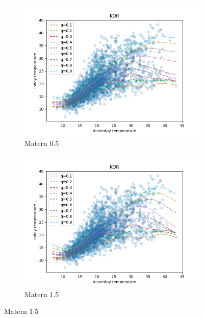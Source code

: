 \begin{figure}[!h]
    \begin{subfigure}[b]{0.5\linewidth}
        \centering
        \includegraphics[width=1.1\textwidth]{images/melborune_matern_0.5_kernel_quantile_regression.png}
        \caption{Matern 0.5} 
        \label{} 
        \vspace{4ex}
    \end{subfigure} 
    \begin{subfigure}[b]{0.5\linewidth}
        \centering
        \includegraphics[width=1.1\textwidth]{images/melborune_matern_1.5_kernel_quantile_regression.png}
        \caption{Matern 1.5} 
        \label{} 
        \vspace{4ex}
    \end{subfigure}


\end{figure}
